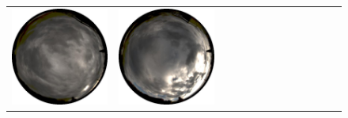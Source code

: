 \documentclass{report}
\begin{document}
\begin{figure}[!th]
\begin{tabular}{@{}rcccccccccccc@{}}
    \includegraphics[width=\customwidth]{./figures/database/20131106_155906.jpg} &
    \includegraphics[width=\customwidth]{./figures/database/20131106_163057.jpg}


\end{tabular}
\end{figure}
\end{document}
